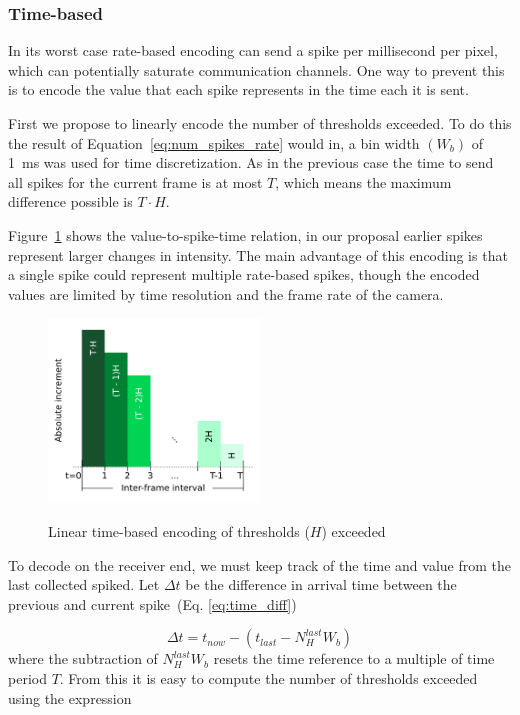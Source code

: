 \documentclass[twocolumn]{article}
\begin{document}
\subsubsection{Time-based}
In its worst case rate-based encoding can send a spike per millisecond per pixel, which can potentially saturate communication channels. One way to prevent this is to encode the value that each spike represents in the time each it is sent.

First we propose to linearly encode the number of thresholds exceeded. To do this the result of Equation~\ref{eq:num_spikes_rate} would in, a bin width $\left(W_{b}\right)$ of 1~ms was used for time discretization. As in the previous case the time to send all spikes for the current frame is at most $T$, which means the maximum difference possible is $T\cdot H$.

Figure~\ref{fig:linear_time} shows the value-to-spike-time relation, in our proposal earlier spikes represent larger changes in intensity. The main advantage of this encoding is that a single spike could represent multiple rate-based spikes, though the encoded values are limited by time resolution and the frame rate of the camera.

\begin{figure}[htb]
  \includegraphics[width=0.5\textwidth]{spike_stream_time}
  \label{fig:linear_time}
  \caption{Linear time-based encoding of thresholds ($H$) exceeded}
\end{figure} 

To decode on the receiver end, we must keep track of the time and value from the last collected spiked. Let $\Delta t$ be the difference in arrival time between the previous and current spike~(Eq. \ref{eq:time_diff})

\begin{equation}
\Delta t = t_{now} - \left( t_{last} - N_{H}^{last}W_{b} \right)
\label{eq:time_diff}
\end{equation}
where the subtraction of $N_{H}^{last}W_{b}$ resets the time reference to a multiple of time period $T$. From this it is easy to compute the number of thresholds exceeded using the expression
\end{document}
